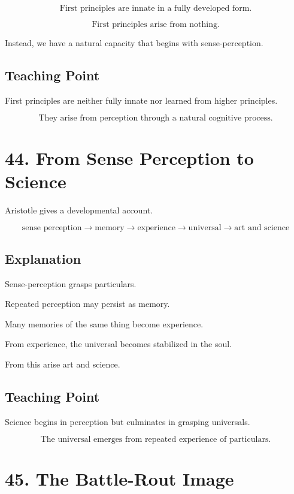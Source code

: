 \documentclass[12pt]{article}
\begin{document}
\[
\text{First principles are innate in a fully developed form.}
\]

\[
\text{First principles arise from nothing.}
\]

Instead, we have a natural capacity that begins with sense-perception.

\subsection*{Teaching Point}

First principles are neither fully innate nor learned from higher principles.

\[
\boxed{
\text{They arise from perception through a natural cognitive process.}
}
\]

\section*{44. From Sense Perception to Science}

Aristotle gives a developmental account.

\[
\text{sense perception}
\rightarrow
\text{memory}
\rightarrow
\text{experience}
\rightarrow
\text{universal}
\rightarrow
\text{art and science}
\]

\subsection*{Explanation}

Sense-perception grasps particulars.

Repeated perception may persist as memory.

Many memories of the same thing become experience.

From experience, the universal becomes stabilized in the soul.

From this arise art and science.

\subsection*{Teaching Point}

Science begins in perception but culminates in grasping universals.

\[
\boxed{
\text{The universal emerges from repeated experience of particulars.}
}
\]

\section*{45. The Battle-Rout Image}
\end{document}
